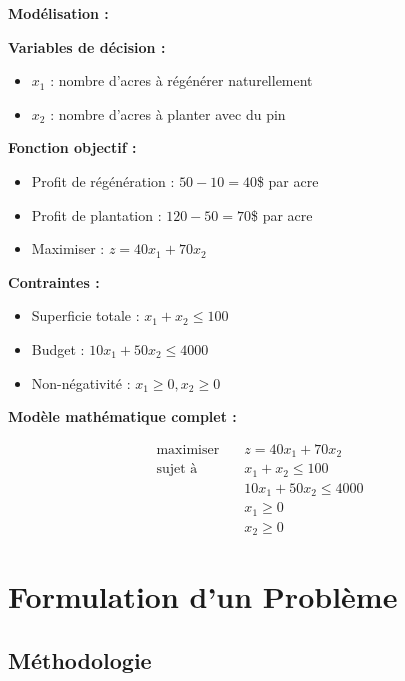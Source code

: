 \documentclass[12pt,a4paper]{article}
\begin{document}
\begin{methode}
\textbf{Modélisation :}

\textbf{Variables de décision :}
\begin{itemize}
    \item $x_1$ : nombre d'acres à régénérer naturellement
    \item $x_2$ : nombre d'acres à planter avec du pin
\end{itemize}

\textbf{Fonction objectif :}
\begin{itemize}
    \item Profit de régénération : $50 - 10 = 40$\$ par acre
    \item Profit de plantation : $120 - 50 = 70$\$ par acre
    \item Maximiser : $z = 40x_1 + 70x_2$
\end{itemize}

\textbf{Contraintes :}
\begin{itemize}
    \item Superficie totale : $x_1 + x_2 \leq 100$
    \item Budget : $10x_1 + 50x_2 \leq 4000$
    \item Non-négativité : $x_1 \geq 0, x_2 \geq 0$
\end{itemize}
\end{methode}

\begin{exemple}
\textbf{Modèle mathématique complet :}

\begin{align*}
\text{maximiser} \quad & z = 40x_1 + 70x_2\\
\text{sujet à} \quad & x_1 + x_2 \leq 100\\
& 10x_1 + 50x_2 \leq 4000\\
& x_1 \geq 0\\
& x_2 \geq 0
\end{align*}
\end{exemple}

\newpage
\section{Formulation d'un Problème}

\subsection{Méthodologie}
\end{document}
